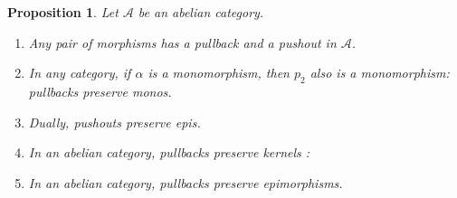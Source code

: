 \documentclass{article}
\newcommand{\Acat}{\mathcal{A}}
\theoremstyle{plain}
\newtheorem{proposition}[theorem]{Proposition}
\theoremstyle{definition}
\theoremstyle{remark}
\begin{document}
\begin{proposition}
    Let $\Acat$ be an abelian category.
    \begin{enumerate}
        \item Any pair of morphisms has a pullback and a pushout in $\Acat$.
        \item In any category, if $\alpha$ is a monomorphism, then $p_2$ also is a monomorphism: pullbacks preserve monos.
        \item Dually, pushouts preserve epis.
        \item In an abelian category, pullbacks preserve kernels :
        \begin{center}
        \end{center}
        \item In an abelian category, pullbacks preserve epimorphisms.
    \end{enumerate}
\end{proposition}
\end{document}
